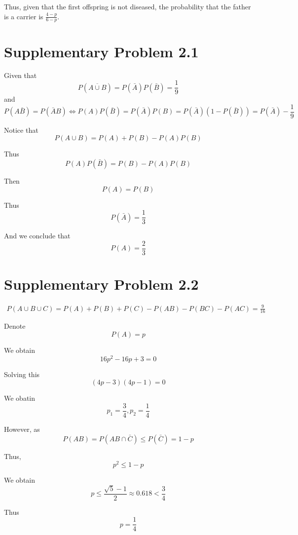 \documentclass[a4paper, UTF-8]{article}
\theoremstyle{plain}
\begin{document}
Thus, given that the first offspring is not diseased, the probability that the father is a carrier is $\boxed{\frac{4-p}{6-p}}$.

\section{Supplementary Problem 2.1}

Given that 
$$
P(\overline{A \cup B})= P(\bar{A})P(\bar{B})= \frac{1}{9}
$$
and 
$$
P(A \bar{B}) = P(\bar{A}B) \Leftrightarrow P(A)P(\bar{B}) = P(\bar{A}) P(B) = P(\bar{A})(1 - P(\bar{B})) = P(\bar{A}) - \frac{1}{9}
$$

Notice that 
$$
P(A \cup B) = P(A) + P(B) - P(A)P(B)
$$

Thus 
$$
P(A)P(\bar{B}) = P(B) - P(A)P(B)
$$

Then 
$$
P(A) = P(B)
$$

Thus 
$$
P(\bar{A}) = \frac{1}{3}
$$

And we conclude that 
$$
P(A) = \frac{2}{3}
$$

\section{Supplementary Problem 2.2}

\begin{align*} 
P(A\cup B\cup C) = P(A) + P(B) + P(C) - P(AB) - P(BC) - P(AC) = \frac{9}{16}
\end{align*}

Denote 
$$
P(A) = p
$$

We obtain 
$$
16p^2 - 16 p  +3 = 0
$$

Solving this 
$$
(4p - 3)(4p - 1) = 0
$$

We obatin 
$$
p_1 = \frac{3}{4}, p_2 = \frac{1}{4}
$$

However, as 
$$
P(AB) = P(AB \cap \bar{C}) \leq P(\bar{C}) = 1-p
$$

Thus, 
$$
p^2 \leq 1 - p
$$

We obtain 
$$
p \leq \frac{\sqrt{5} - 1}{2} \approx 0.618 < \frac{3}{4}
$$

Thus 
$$
p = \frac{1}{4}
$$
\end{document}

